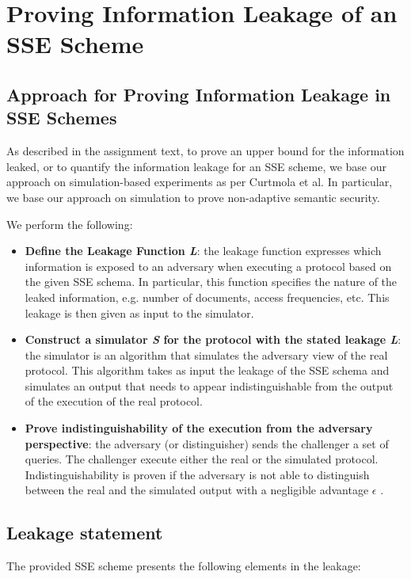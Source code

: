 \section{Proving Information Leakage of an SSE Scheme}

\subsection{Approach for Proving Information Leakage in SSE Schemes}

As described in the assignment text, to prove an upper bound for the information leaked, or to quantify the information leakage for an SSE scheme, we base our approach on simulation-based experiments as per Curtmola et
al. In particular, we base our approach on simulation to prove non-adaptive semantic security.

We perform the following:

\begin{itemize}
    \item \textbf{Define the Leakage Function \textit{L}}: the leakage function expresses which information is exposed to an adversary when executing a protocol based on the given SSE schema. In particular, this function specifies the nature of the leaked information, e.g. number of documents, access frequencies, etc. This leakage is then given as input to the simulator.
    \item \textbf{Construct a simulator \textit{S} for the protocol with the stated leakage \textit{L}}: the simulator is an algorithm that simulates the adversary view of the real protocol. This algorithm takes as input the leakage of the SSE schema and simulates an output that needs to appear indistinguishable from the output of the execution of the real protocol.
    \item \textbf{Prove indistinguishability of the execution from the adversary perspective}: the adversary (or distinguisher) sends the challenger a set of queries. The challenger execute either the real or the simulated protocol. Indistinguishability is proven if the adversary is not able to distinguish between the real and the simulated output with a negligible advantage $\epsilon$ .
\end{itemize}

\subsection{Leakage statement}

The provided SSE scheme presents the following elements in the leakage: 

